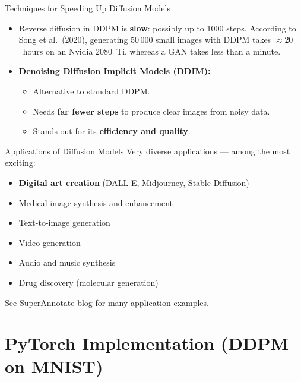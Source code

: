 \documentclass[aspectratio=169,10pt]{beamer}
\begin{document}
\begin{frame}{Techniques for Speeding Up Diffusion Models}
  \begin{itemize}
    \item Reverse diffusion in DDPM is \textbf{slow}: possibly up to 1000
          steps.  According to Song et al.\ (2020), generating 50\,000 small
          images with DDPM takes $\approx 20$~hours on an Nvidia 2080~Ti,
          whereas a GAN takes less than a minute.
    \item \textbf{Denoising Diffusion Implicit Models (DDIM):}
          \begin{itemize}
            \item Alternative to standard DDPM.
            \item Needs \textbf{far fewer steps} to produce clear images
                  from noisy data.
            \item Stands out for its \textbf{efficiency and quality}.
          \end{itemize}
  \end{itemize}
\end{frame}

\begin{frame}{Applications of Diffusion Models}
  Very diverse applications — among the most exciting:
  \begin{itemize}
    \item \textbf{Digital art creation} (DALL-E, Midjourney, Stable Diffusion)
    \item Medical image synthesis and enhancement
    \item Text-to-image generation
    \item Video generation
    \item Audio and music synthesis
    \item Drug discovery (molecular generation)
  \end{itemize}
  \vspace{4pt}
  See \href{https://www.superannotate.com/blog/diffusion-models}{SuperAnnotate blog}
  for many application examples.
\end{frame}

\section{PyTorch Implementation (DDPM on MNIST)}
\end{document}
